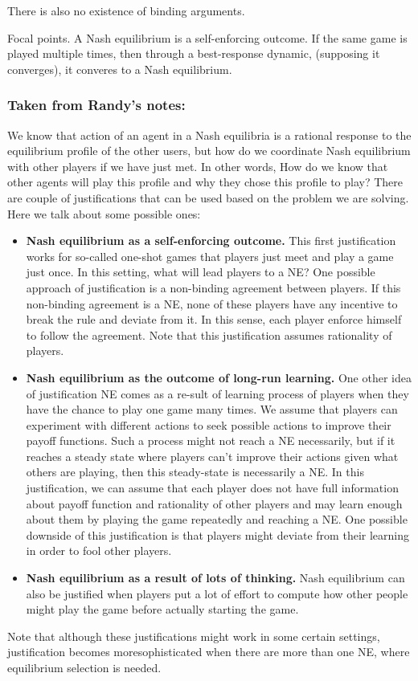 There is also no existence of binding arguments. 

Focal points. A Nash equilibrium is a self-enforcing outcome. If the same game is played multiple times, then through a best-response dynamic, (supposing it converges), it converes to a Nash equilibrium.

\subsubsection*{Taken from Randy's notes:}
We know that action of an agent in a Nash equilibria is a rational response to the equilibrium profile of the other users, but how do we coordinate Nash equilibrium with other players if we have just met. In other words, How do we know that other agents will play this profile and why they chose this profile to play?
There are couple of justifications that can be used based on the problem we are solving. Here we talk about some possible ones:
\begin{itemize}
    \item  \textbf{Nash equilibrium as a self-enforcing outcome.} This first justification works for so-called one-shot games that players just meet and play a game just once. In this setting, what will lead players to a NE? One possible approach of justification is a non-binding agreement between players. If this non-binding agreement is a NE, none of these players have any incentive to break the rule and deviate from it. In this sense, each player enforce himself to follow the agreement. Note that this justification assumes rationality of players.
    \item \textbf{Nash equilibrium as the outcome of long-run learning.} One other idea of justification NE comes as a re-sult of learning process of players when they have the chance to play one game many times. We assume that players can experiment with different actions to seek possible actions to improve their payoff functions. Such a process might not reach a NE necessarily, but if it reaches a steady state where players can't improve their actions given what others are playing, then this steady-state is necessarily a NE. In this justification, we can assume that each player does not have full information about payoff function and rationality of other players and may learn enough about them by playing the game repeatedly and reaching a NE. One possible downside of this justification is that players might deviate from their learning in order to fool other players.
    \item \textbf{Nash equilibrium as a result of lots of thinking.} Nash equilibrium can also be justified when players put a lot of effort to compute how other people might play the game before actually starting the game. 
\end{itemize}
Note that although these justifications might work in some certain settings, justification becomes moresophisticated when there are more than one NE, where equilibrium selection is needed.